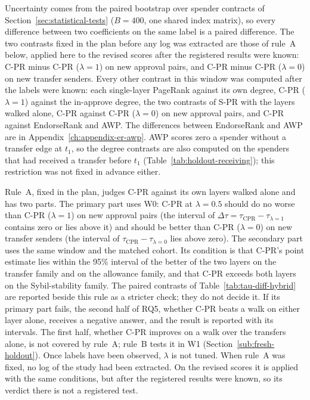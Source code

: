Uncertainty comes from the paired bootstrap over spender contracts of Section~\ref{sec:statistical-tests} ($B=400$, one shared index matrix), so every difference between two coefficients on the same label is a paired difference. The two contrasts fixed in the plan before any log was extracted are those of rule~A below, applied here to the revised scores after the registered results were known: C-PR minus C-PR ($\lambda=1$) on new approval pairs, and C-PR minus C-PR ($\lambda=0$) on new transfer senders. Every other contrast in this window was computed after the labels were known: each single-layer PageRank against its own degree, C-PR ($\lambda=1$) against the in-approve degree, the two contrasts of S-PR with the layers walked alone, C-PR against C-PR ($\lambda=0$) on new approval pairs, and C-PR against EndorseRank and AWP. The differences between EndorseRank and AWP are in Appendix~\ref{ch:appendix-er-awp}. AWP scores zero a spender without a transfer edge at $t_1$, so the degree contrasts are also computed on the spenders that had received a transfer before $t_1$ (Table~\ref{tab:holdout-receiving}); this restriction was not fixed in advance either.

Rule~A, fixed in the plan, judges C-PR against its own layers walked alone and has two parts. The primary part uses W0: C-PR at $\lambda=0.5$ should do no worse than C-PR ($\lambda=1$) on new approval pairs (the interval of $\Delta\tau=\tau_{\mathrm{CPR}}-\tau_{\lambda=1}$ contains zero or lies above it) and should be better than C-PR ($\lambda=0$) on new transfer senders (the interval of $\tau_{\mathrm{CPR}}-\tau_{\lambda=0}$ lies above zero). The secondary part uses the same window and the matched cohort. Its condition is that C-PR's point estimate lies within the 95\% interval of the better of the two layers on the transfer family and on the allowance family, and that C-PR exceeds both layers on the Sybil-stability family. The paired contrasts of Table~\ref{tab:tau-diff-hybrid} are reported beside this rule as a stricter check; they do not decide it. If its primary part fails, the second half of RQ5, whether C-PR beats a walk on either layer alone, receives a negative answer, and the result is reported with its intervals. The first half, whether C-PR improves on a walk over the transfers alone, is not covered by rule~A; rule~B tests it in W1 (Section~\ref{sub:fresh-holdout}). Once labels have been observed, $\lambda$ is not tuned. When rule~A was fixed, no log of the study had been extracted. On the revised scores it is applied with the same conditions, but after the registered results were known, so its verdict there is not a registered test.

